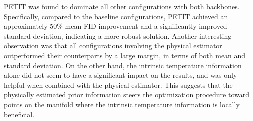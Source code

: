 PETIT was found to dominate all other configurations with both backbones.
Specifically, compared to the baseline configurations, PETIT achieved an approximately $50\%$ mean FID improvement and a significantly improved standard deviation, indicating a more robust solution.
Another interesting observation was that all configurations involving the physical estimator outperformed their counterparts by a large margin, in terms of both mean and standard deviation.
On the other hand, the intrinsic temperature information alone did not seem to have a significant impact on the results, and was only helpful when combined with the physical estimator.
This suggests that the physically estimated prior information steers the optimization procedure toward points on the manifold where the intrinsic temperature information is locally beneficial.

